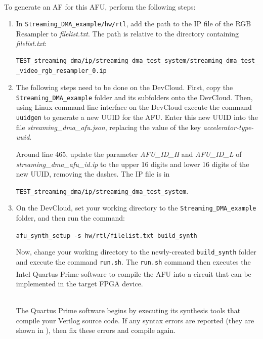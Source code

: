 \documentclass[11pt, twoside, pdftex]{article}
\newcommand{\red}[1]{{\color{red}\sf{#1}}}
\begin{document}
~\\
\noindent
To generate an AF for this AFU, perform the following steps:
\begin{enumerate}
    \item In \texttt{Streaming\_DMA\_example/hw/rtl}, add the path to the IP file of the RGB Resampler to {\it filelist.txt}. The path is relative to the directory containing {\it filelist.txt}:
    
\lstset{language=C,numbers=none,escapechar=|}
\begin{lstlisting}[name=filelist]
TEST_streaming_dma/ip/streaming_dma_test_system/streaming_dma_test_system
_video_rgb_resampler_0.ip
\end{lstlisting}

    \item The following steps need to be done on the DevCloud. First, copy the \texttt{Streaming\_DMA\_example} folder and its subfolders onto the DevCloud. Then, using Linux command line interface on the DevCloud execute the command \texttt{uuidgen} to generate a new UUID for the AFU. Enter this new UUID into the file {\it streaming\_dma\_afu.json}, replacing the value of the key {\it accelerator-type-uuid}.
    
    Around line 465, update the parameter {\it AFU\_ID\_H} and {\it AFU\_ID\_L} of {\it streaming\_dma\_afu\_id.ip} to the upper 16 digits and lower 16 digits of the new UUID, removing the dashes. The IP file is in
    \begin{center}
    \texttt{TEST\_streaming\_dma/ip/streaming\_dma\_test\_system}.
    \end{center}
    
    \item  On the DevCloud, set your working directory to the \texttt{Streaming\_DMA\_example} folder, and then run the command: 

\noindent
\begin{center}
\texttt{afu\_synth\_setup -s hw/rtl/filelist.txt build\_synth}
\end{center}

Now, change your working directory to the newly-created \texttt{build\_synth} folder and 
execute the command \texttt{run.sh}. 
The \texttt{run.sh} command then executes the Intel 
Quartus\textsuperscript{\textregistered} Prime software to compile the AFU into a circuit
that can be implemented in the target FPGA device.

~\\
\noindent
The Quartus Prime software begins by executing its synthesis tools that
compile your Verilog source code. If any syntax errors are reported (they are shown in 
\red{red}), then fix these errors and compile again. 


\end{enumerate}
\end{document}

